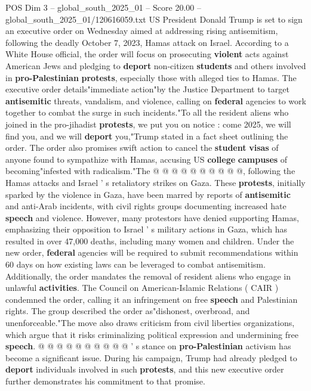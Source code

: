 \begin{textsample}{POS Dim 3 – global\_south\_2025\_01 – Score 20.00 – global\_south\_2025\_01/120616059.txt}  \label{ex:f3_pos_398}
US President Donald Trump is set to sign an executive order on Wednesday aimed at addressing rising antisemitism, following the deadly October 7, 2023, Hamas attack on Israel.
According to a White House official, the order will focus on prosecuting \textbf{violent} acts against American Jews and pledging to \textbf{deport} non-citizen \textbf{students} and others involved in \textbf{pro-Palestinian} \textbf{protests}, especially those with alleged ties to Hamas.
The executive order details"immediate action"by the Justice Department to target \textbf{antisemitic} threats, vandalism, and violence, calling on \textbf{federal} agencies to work together to combat the surge in such incidents."To all the resident aliens who joined in the pro-jihadist \textbf{protests}, we put you on notice : come 2025, we will find you, and we will \textbf{deport} you,"Trump stated in a fact sheet outlining the order.
The order also promises swift action to cancel the \textbf{student} \textbf{visas} of anyone found to sympathize with Hamas, accusing US \textbf{college} \textbf{campuses} of becoming"infested with radicalism."The @ @ @ @ @ @ @ @ @ @, following the Hamas attacks and Israel ' s retaliatory strikes on Gaza.
These \textbf{protests}, initially sparked by the violence in Gaza, have been marred by reports of \textbf{antisemitic} and anti-Arab incidents, with civil rights groups documenting increased hate \textbf{speech} and violence.
However, many protestors have denied supporting Hamas, emphasizing their opposition to Israel ' s military actions in Gaza, which has resulted in over 47,000 deaths, including many women and children.
Under the new order, \textbf{federal} agencies will be required to submit recommendations within 60 days on how existing laws can be leveraged to combat antisemitism.
Additionally, the order mandates the removal of resident aliens who engage in unlawful \textbf{activities}.
The Council on American-Islamic Relations ( CAIR ) condemned the order, calling it an infringement on free \textbf{speech} and Palestinian rights.
The group described the order as"dishonest, overbroad, and unenforceable."The move also draws criticism from civil liberties organizations, which argue that it risks criminalizing political expression and undermining free \textbf{speech}. @ @ @ @ @ @ @ @ @ @ ' s stance on \textbf{pro-Palestinian} activism has become a significant issue.
During his campaign, Trump had already pledged to \textbf{deport} individuals involved in such \textbf{protests}, and this new executive order further demonstrates his commitment to that promise.

\end{textsample}
